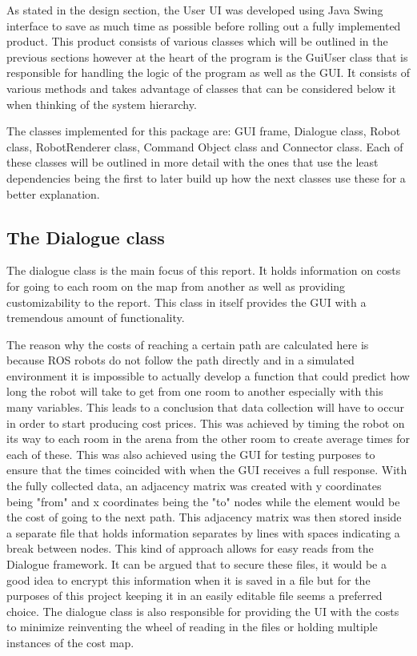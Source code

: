     As stated in the design section, the User UI was developed using Java Swing interface to save as much time as possible before rolling out a fully implemented product. This product consists of various classes which will be outlined in the previous sections however at the heart of the program is the GuiUser class that is responsible for handling the logic of the program as well as the GUI. It consists of various methods and takes advantage of classes that can be considered below it when thinking of the system hierarchy.

    The classes implemented for this package are: GUI frame, Dialogue class, Robot class, RobotRenderer class, Command Object class and Connector class. Each of these classes will be outlined in more detail with the ones that use the least dependencies being the first to later build up how the next classes use these for a better explanation.

    \subsection{The Dialogue class}
      The dialogue class is the main focus of this report. It holds information on costs for going to each room on the map from another as well as providing customizability to the report. This class in itself provides the GUI with a tremendous amount of functionality.

      The reason why the costs of reaching a certain path are calculated here is because ROS robots do not follow the path directly and in a simulated environment it is impossible to actually develop a function that could predict how long the robot will take to get from one room to another especially with this many variables. This leads to a conclusion that data collection will have to occur in order to start producing cost prices. This was achieved by timing the robot on its way to each room in the arena from the other room to create average times for each of these. This was also achieved using the GUI for testing purposes to ensure that the times coincided with when the GUI receives a full response. With the fully collected data, an adjacency matrix was created with y coordinates being "from" and x coordinates being the "to" nodes while the element would be the cost of going to the next path. This adjacency matrix was then stored inside a separate file that holds information separates by lines with spaces indicating a break between nodes. This kind of approach allows for easy reads from the Dialogue framework. It can be argued that to secure these files, it would be a good idea to encrypt this information when it is saved in a file but for the purposes of this project keeping it in an easily editable file seems a preferred choice. The dialogue class is also responsible for providing the UI with the costs to minimize reinventing the wheel of reading in the files or holding multiple instances of the cost map.

